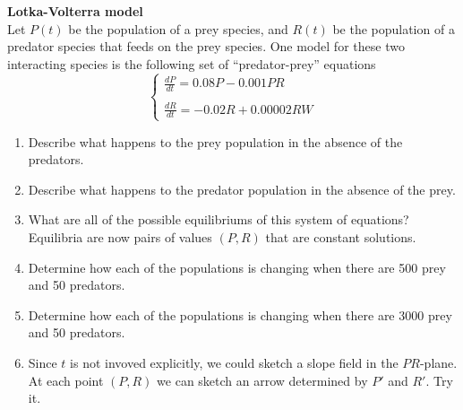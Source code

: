 \documentclass[11pt]{article}
\begin{document}
    
{\bf Lotka-Volterra model}\\
Let $P(t)$ be the population of a prey species, and $R(t)$ be the population  of a predator species that feeds on the prey species.  One model 
for these two interacting species is the following set of ``predator-prey'' equations
\begin{displaymath}
\left\{ \begin{array}{ll}
\frac{dP}{dt} = 0.08P-0.001PR \\
\\
\frac{dR}{dt} = -0.02R+0.00002RW
\end{array} \right.
\end{displaymath}
\begin{enumerate}
\item{Describe what happens to the prey population in the absence of the predators.}
\item{Describe what happens to the predator population in the absence of the prey.}
\item{What are all of the possible equilibriums of this system of equations?  Equilibria are now pairs of values $(P,R)$ that are constant solutions.}
\item{Determine how each of the populations is changing when there are 500 prey and 50 predators.}
\item{Determine how each of the populations is changing when there are 3000 prey and 50 predators.}
\item{Since $t$ is not invoved explicitly, we could sketch a slope field in the $PR$-plane.  At each point $(P,R)$ we can sketch an arrow determined by $P'$ and $R'$.  Try it.}
\end{enumerate}
\end{document}
